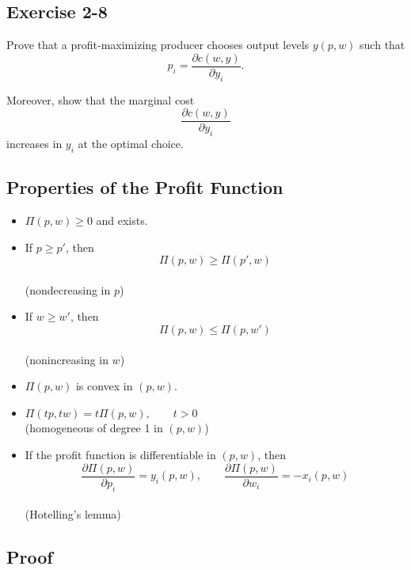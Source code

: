 \begin{tcolorbox}[breakable]

\subsection*{Exercise 2-8}

Prove that a profit-maximizing producer chooses output levels $y(p,w)$ such that
\[
p_i = \frac{\partial c(w,y)}{\partial y_i}.
\]

Moreover, show that the marginal cost
\[
\frac{\partial c(w,y)}{\partial y_i}
\]
increases in $y_i$ at the optimal choice.

\end{tcolorbox}

\subsection*{Properties of the Profit Function}

\begin{itemize}
    \item[$\Pi$.1] $\Pi(p,w)\ge 0$ and exists.
    
    \item[$\Pi$.2] If $p \ge p'$, then
    \[
    \Pi(p,w)\ge \Pi(p',w)
    \]\\
    (nondecreasing in $p$)
    
    \item[$\Pi$.3] If $w \ge w'$, then
    \[
    \Pi(p,w)\le \Pi(p,w')
    \]\\
    (nonincreasing in $w$)
    
    \item[$\Pi$.4] $\Pi(p,w)$ is convex in $(p,w)$.
    
    \item[$\Pi$.5] $\Pi(tp,tw)=t\Pi(p,w), \qquad t>0$\\
    (homogeneous of degree 1 in $(p,w)$)
    
    \item[$\Pi$.6] If the profit function is differentiable in $(p,w)$, then
    \[
    \frac{\partial \Pi(p,w)}{\partial p_i}=y_i(p,w),
    \qquad
    \frac{\partial \Pi(p,w)}{\partial w_i}=-x_i(p,w)
    \]\\
    (Hotelling's lemma)
\end{itemize}

\subsection*{Proof}

